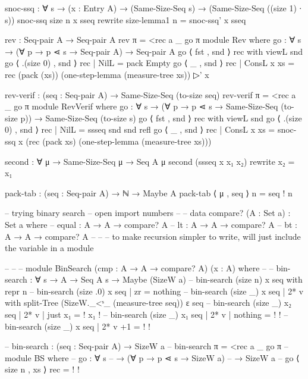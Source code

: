       snoc-ssq : ∀ {s}
              → (x : Entry A)
              → (Same-Size-Seq s)
              → (Same-Size-Seq ((size 1) ∙ s))
      snoc-ssq {size n} x sseq rewrite size-lemma1 {n} = snoc-ssq' x sseq

      rev : Seq-pair A → Seq-pair A
      rev π = <rec a _ go π
        module Rev where
        go : ∀ s → (∀ p → p ⋖ s → Seq-pair A) → Seq-pair A
        go ⟨ fst , snd ⟩ rec with viewL snd
        go ⟨ .(size 0) , snd ⟩ rec | NilL = pack Empty
        go ⟨ _ , snd ⟩ rec | ConsL x xs =
            rec (pack (xs)) (one-step-lemma (measure-tree xs)) ▷' x

      rev-verif : (seq : Seq-pair A) → Same-Size-Seq (to-size seq)
      rev-verif π = <rec a _ go π
        module RevVerif where
        go : ∀ s
            → (∀ p → p ⋖ s → Same-Size-Seq (to-size p))
            → Same-Size-Seq (to-size s)
        go ⟨ fst , snd ⟩ rec with viewL snd
        go ⟨ .(size 0) , snd ⟩ rec | NilL = ssseq snd snd refl
        go ⟨ _ , snd ⟩ rec | ConsL x xs = snoc-ssq x
          (rec (pack xs) (one-step-lemma (measure-tree xs)))

      second : ∀ {μ} → Same-Size-Seq μ → Seq A μ
      second (ssseq x x₁ x₂) rewrite x₂ = x₁

      pack-tab : (seq : Seq-pair A) → ℕ → Maybe A
      pack-tab ⟨ μ , seq ⟩ n = seq ! n

      -- trying binary search
      -- open import numbers
      --
      -- data compare? (A : Set a) : Set a where
      --   equal : A → A → compare? A
      --   lt : A → A → compare? A
      --   bt : A → A → compare? A
      --
      -- -- to make recursion simpler to write, will just include the variable in a module

      --
      --
      -- module BinSearch (cmp : A → A → compare? A) (x : A) where
      --
      --   bin-search : ∀ s → A → Seq A s → Maybe (SizeW {a})
      --   bin-search (size n) x seq with repr n
      --   bin-search (size .0) x seq | zr = nothing
      --   bin-search (size _) x seq | 2* v with  split-Tree (SizeW._<ˢ_ (measure-tree seq)) ε seq
      --   bin-search (size _) x₂ seq | 2* v | just x₁ = {! x₁  !}
      --   bin-search (size _) x₁ seq | 2* v | nothing = {!   !}
      --   bin-search (size _) x seq | 2* v +1 = {!   !}

        -- bin-search : (seq : Seq-pair A) → SizeW {a}
        -- bin-search π = <rec a _ go π
        --     module BS where
        --     go : ∀ s
        --         → (∀ p → p ⋖ s → SizeW {a})
        --         → SizeW {a}
        --     go ⟨ size n , xs ⟩ rec = {!   !}



